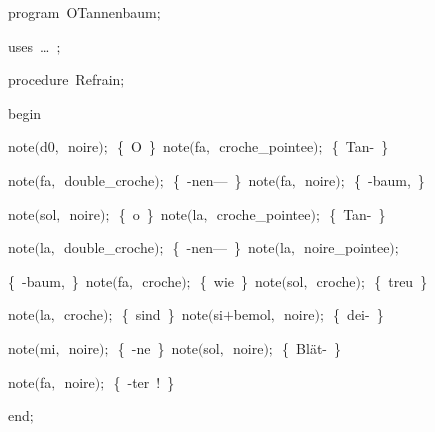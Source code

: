 
{
\parindent {}
\medskip

\carrenoir
\vspace{\neglskip}\mbox{\blc  \idt  \mcl program\idt {}\ OTannenbaum$;$
}\par 
\vspace{\neglskip}\mbox{\blc \blk\idt \mcl uses\idt \ \ldots\ $;$
}\par 
\medskip

\pagebreak[3] 
\vspace{\neglskip}\mbox{\blc  \blk\idt  \mcl procedure\idt \ Refrain$;$}\par 
\vspace{\neglskip}\mbox{\blc  \blk\idt  \mcl begin\idt }\par 
\vspace{\neglskip}\mbox{\blc  \blk\blk\idt  note$($d0$,$\ noire$)$$;$\ \cmt  \{\ O\ \}\idt \ note$($fa$,$\ croche\_pointee$)$$;$\ \cmt  \{\ Tan-\ \}\idt \ }\par 
\vspace{\neglskip}\mbox{\blc  \blk\blk\idt  note$($fa$,$\ double\_croche$)$$;$\ \cmt  \{\ -nen---\ \}\idt \ note$($fa$,$\ noire$)$$;$\ \cmt  \{\ -baum,\ \}\idt }\par 
\vspace{\neglskip}\mbox{\blc  \blk\blk\idt  note$($sol$,$\ noire$)$$;$\ \cmt  \{\ o\ \}\idt \ note$($la$,$\ croche\_pointee$)$$;$\ \cmt  \{\ Tan-\ \}\idt \ }\par 
\vspace{\neglskip}\mbox{\blc  \blk\blk\idt  note$($la$,$\ double\_croche$)$$;$\ \cmt  \{\ -nen---\ \}\idt \ note$($la$,$\ noire\_pointee$)$$;$\ }\par 
\vspace{\neglskip}\mbox{\blc  \blk\blk\idt  \cmt  \{\ -baum,\ \}\idt \ note$($fa$,$\ croche$)$$;$\ \cmt  \{\ wie\ \}\idt \ note$($sol$,$\ croche$)$$;$\ \cmt  \{\ treu\ \}\idt \ }\par 
\vspace{\neglskip}\mbox{\blc  \blk\blk\idt  note$($la$,$\ croche$)$$;$\ \cmt  \{\ sind\ \}\idt \ note$($si$+$bemol$,$\ noire$)$$;$\ \cmt  \{\ dei-\ \}\idt \ }\par 
\vspace{\neglskip}\mbox{\blc  \blk\blk\idt  note$($mi$,$\ noire$)$$;$\ \cmt  \{\ -ne\ \}\idt \ note$($sol$,$\ noire$)$$;$\ \cmt  \{\ Blät-\ \}\idt \ }\par 
\vspace{\neglskip}\mbox{\blc  \blk\blk\idt  note$($fa$,$\ noire$)$$;$\ \cmt  \{\ -ter\ !\ \}\idt }\par 
\vspace{\neglskip}\mbox{\blc  \blk\idt  \mcl end\idt $;$}\par 
\medskip

}
